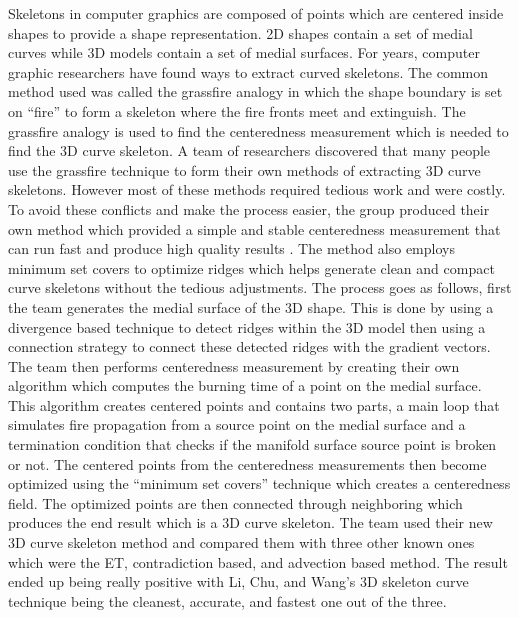\documentclass{article}
\begin{document}
Skeletons in computer graphics are composed of points which are centered inside shapes to provide a shape representation. 2D shapes contain a set of medial curves while 3D models contain a set of medial surfaces. For years, computer graphic researchers have found ways to extract curved skeletons. The common method used was called the grassfire analogy in which the shape boundary is set on “fire” to form a skeleton where the fire fronts meet and extinguish. The grassfire analogy is used to find the centeredness measurement which is needed to find the 3D curve skeleton. A team of researchers discovered that many people use the grassfire technique to form their own methods of extracting 3D curve skeletons. However most of these methods required tedious work and were costly. To avoid these conflicts and make the process easier, the group produced their own method which provided a simple and stable centeredness measurement that can run fast and produce high quality results \cite{9173765}. The method also employs minimum set covers to optimize ridges which helps generate clean and compact curve skeletons without the tedious adjustments. The process goes as follows, first the team generates the medial surface of the 3D shape. This is done by using a divergence based technique to detect ridges within the 3D model then using a connection strategy to connect these detected ridges with the gradient vectors. The team then performs centeredness measurement by creating their own algorithm which computes the burning time of a point on the medial surface. This algorithm creates centered points and contains two parts, a main loop that simulates fire propagation from a source point on the medial surface and a termination condition that checks if the manifold surface source point is broken or not. The centered points from the centeredness measurements then become optimized using the “minimum set covers” technique which creates a centeredness field. The optimized points are then connected through neighboring which produces the end result which is a 3D curve skeleton. The team used their new 3D curve skeleton method and compared them with three other known ones which were the ET, contradiction based, and advection based method. The result ended up being really positive with Li, Chu, and Wang’s 3D skeleton curve technique being the cleanest, accurate, and fastest one out of the three.
	
\end{document}
